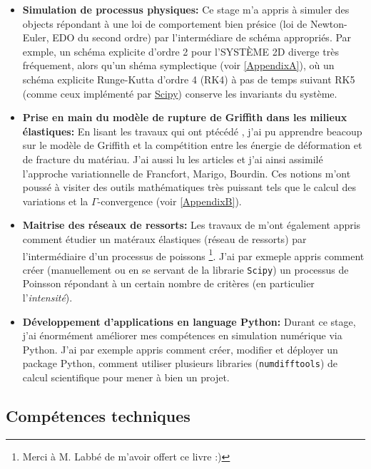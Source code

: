 \begin{itemize}
    \item \textbf{Simulation de processus physiques:} Ce stage m'a appris à simuler des objects répondant à une loi de comportement bien présice (loi de Newton-Euler, EDO du second ordre) par l'intermédiare de schéma appropriés. Par exmple, un schéma explicite d'ordre 2 pour l'SYSTÈME 2D diverge très fréquement, alors qu'un shéma symplectique (voir \cref{AppendixA}), où un schéma explicite Runge-Kutta d'ordre 4 (RK4) à pas de temps suivant RK5 (comme ceux implémenté par \href{https://docs.scipy.org/doc/scipy/reference/generated/scipy.integrate.solve_ivp.html}{Scipy}) conserve les invariants du système.
    \item \textbf{Prise en main du modèle de rupture de Griffith dans les milieux élastiques:} En lisant les travaux qui ont ptécédé \parencite{balasoiu2020halthesis}, j'ai pu apprendre beacoup sur le modèle de Griffith et la compétition entre les énergie de déformation et de fracture du matériau. J'ai aussi lu les articles \parencite{francfort1998revisiting,bourdin2008variational} et j'ai ainsi assimilé l'approche variationnelle de Francfort, Marigo, Bourdin. Ces notions m'ont poussé à visiter des outils mathématiques très puissant tels que le calcul des variations et la $\Gamma$-convergence (voir \cref{AppendixB}).
    \item \textbf{Maitrise des réseaux de ressorts:} Les travaux de \citeauthor{balasoiu2020halthesis} m'ont également appris comment étudier un matéraux élastiques (réseau de ressorts) par l'intermédiaire d'un processus de poissons \parencite{khasminskii2011stochastic}\footnote{Merci à M. Labbé de m'avoir offert ce livre :)}. J'ai par exmeple appris comment créer (manuellement ou en se servant de la librarie \texttt{Scipy}) un processus de Poinsson répondant à un certain nombre de critères (en particulier l'\emph{intensité}).
    \item \textbf{Développement d'applications en language Python:} Durant ce stage, j'ai énormément améliorer mes compétences en simulation numérique via Python. J'ai par exemple appris comment créer, modifier et déployer un package Python, comment utiliser plusieurs libraries (\texttt{numdifftools}) de calcul scientifique pour mener à bien un projet.
\end{itemize}




\subsection{Compétences techniques}

